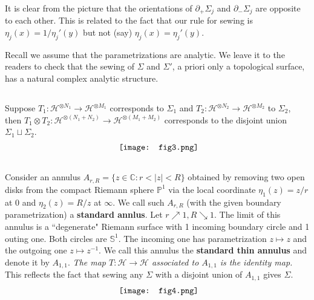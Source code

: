 \documentclass[11pt,b5paper,notitlepage]{article}
\theoremstyle{definition}
\theoremstyle{plain}
\newcommand{\mc}{\mathcal}
\newcommand{\Cbb}{\mathbb C}
\newcommand{\Pbb}{\mathbb P}
\newcommand{\Sbb}{{\mathbb S}}
\numberwithin{equation}{section}
\begin{document}
It is clear from the picture that the orientations of $\partial_+\Sigma_j$ and $\partial_-\Sigma_j$ are opposite to each other. This is related to the fact that our rule for sewing is $\eta_j(x)=1/\eta_j'(y)$ but not (say) $\eta_j(x)=\eta_j'(y)$.

Recall we assume that the parametrizations are analytic. We leave it to the readers to check that the sewing of $\Sigma$ and $\Sigma'$, a priori only a topological surface, has a natural complex analytic structure.


\subsection{}\label{lb5}
Suppose $T_1:\mc H^{\otimes N_1}\rightarrow\mc H^{\otimes M_1}$ corresponds to $\Sigma_1$ and $T_2:\mc H^{\otimes N_2}\rightarrow\mc H^{\otimes M_2}$ to $\Sigma_2$, then $T_1\otimes T_2:\mc H^{\otimes (N_1+N_2)}\rightarrow\mc H^{\otimes(M_1+M_2)}$ corresponds to the disjoint union $\Sigma_1\sqcup\Sigma_2$.
\begin{align*}
	\vcenter{\hbox{{
				\texttt{[image: fig3.png]}}}}
\end{align*}




\subsection{}\label{lb3}

Consider an annulus $A_{r,R}=\{z\in\Cbb:r<|z|<R\}$ obtained by removing two open  disks from the compact Riemann sphere $\Pbb^1$ via the local coordinate $\eta_1(z)=z/r$ at $0$ and $\eta_2(z)=R/z$ at $\infty$. We call such $A_{r,R}$ (with the given boundary parametrization) a \textbf{standard annlus}. Let $r\nearrow 1,R\searrow 1$. The limit of this annulus  is a ``degenerate" Riemann surface with 1 incoming boundary circle and 1 outing one. Both circles are $\Sbb^1$. The incoming one has parametrization $z\mapsto z$ and the outgoing one $z\mapsto z^{-1}$. We call this annulus the \textbf{standard thin annulus} and denote it by  $A_{1,1}$. \emph{The map $T:\mc H\rightarrow\mc H$ associated to  $A_{1,1}$ is the identity map.} This reflects the fact that sewing any $\Sigma$ with a disjoint union of $A_{1,1}$ gives $\Sigma$.
\begin{align*}
	\vcenter{\hbox{{
				\texttt{[image: fig4.png]}}}}
\end{align*}
\end{document}
